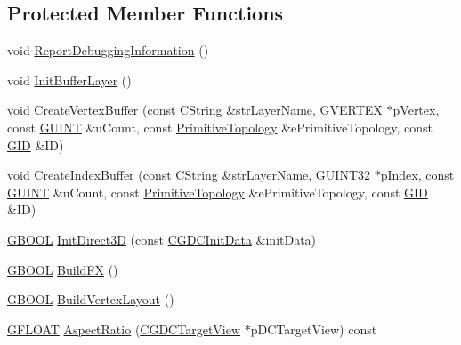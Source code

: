 \subsection*{Protected Member Functions}
\begin{DoxyCompactItemize}
\item 
void \hyperlink{class_c_g_d_c_direct_x11_afc1123f572fcd29dd8a600f036e39e6a}{Report\+Debugging\+Information} ()
\item 
void \hyperlink{class_c_g_d_c_direct_x11_af4f72f620f2eeeaf536bd9b2cd1e082a}{Init\+Buffer\+Layer} ()
\item 
void \hyperlink{class_c_g_d_c_direct_x11_ad11c2454ca2ccd18575afd272f4d1605}{Create\+Vertex\+Buffer} (const C\+String \&str\+Layer\+Name, \hyperlink{struct_g_v_e_r_t_e_x}{G\+V\+E\+R\+T\+E\+X} $\ast$p\+Vertex, const \hyperlink{_g_types_8h_a415305cdf38fc38f67c037973e9a748c}{G\+U\+I\+N\+T} \&u\+Count, const \hyperlink{_g_types_8h_a940e3da6a9b57aae3de0b050e2a7af5e}{Primitive\+Topology} \&e\+Primitive\+Topology, const \hyperlink{_g_types_8h_a5b96ecb16d8e437977d12cd40aa6f6d8}{G\+I\+D} \&I\+D)
\item 
void \hyperlink{class_c_g_d_c_direct_x11_a0306c19580ca1aa9cc820bdf80692037}{Create\+Index\+Buffer} (const C\+String \&str\+Layer\+Name, \hyperlink{_g_types_8h_a2e1a1c77d1349057202e2f34e071019c}{G\+U\+I\+N\+T32} $\ast$p\+Index, const \hyperlink{_g_types_8h_a415305cdf38fc38f67c037973e9a748c}{G\+U\+I\+N\+T} \&u\+Count, const \hyperlink{_g_types_8h_a940e3da6a9b57aae3de0b050e2a7af5e}{Primitive\+Topology} \&e\+Primitive\+Topology, const \hyperlink{_g_types_8h_a5b96ecb16d8e437977d12cd40aa6f6d8}{G\+I\+D} \&I\+D)
\item 
\hyperlink{_g_types_8h_a2901915743626352a6820c5405f556dc}{G\+B\+O\+O\+L} \hyperlink{class_c_g_d_c_direct_x11_a364a4290258c07e409d249553ac1a937}{Init\+Direct3\+D} (const \hyperlink{class_c_g_d_c_init_data}{C\+G\+D\+C\+Init\+Data} \&init\+Data)
\item 
\hyperlink{_g_types_8h_a2901915743626352a6820c5405f556dc}{G\+B\+O\+O\+L} \hyperlink{class_c_g_d_c_direct_x11_a89cbbe22a20643f9bc4e456ab3f2a1a2}{Build\+F\+X} ()
\item 
\hyperlink{_g_types_8h_a2901915743626352a6820c5405f556dc}{G\+B\+O\+O\+L} \hyperlink{class_c_g_d_c_direct_x11_aba179b4428c25449ecd379ab9b8e8cdf}{Build\+Vertex\+Layout} ()
\item 
\hyperlink{_g_types_8h_abf6eba8223df62f199b811a6c52ff2ef}{G\+F\+L\+O\+A\+T} \hyperlink{class_c_g_d_c_direct_x11_a90c1da5a4744fb77754c296372589814}{Aspect\+Ratio} (\hyperlink{class_c_g_d_c_target_view}{C\+G\+D\+C\+Target\+View} $\ast$p\+D\+C\+Target\+View) const 

\end{DoxyCompactItemize}
